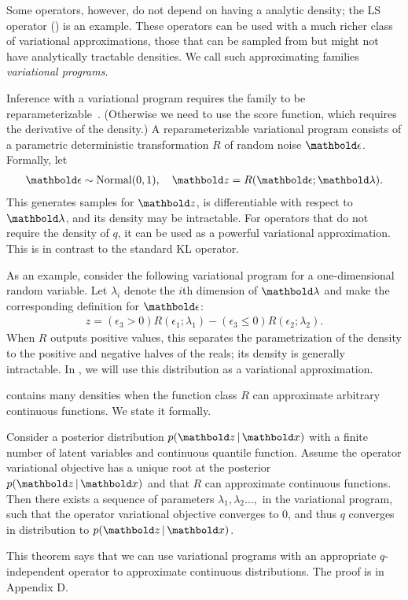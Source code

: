 Some
operators, however, do not depend on having a analytic density; the
\gls{LS} operator () is an example.  These
operators can be used with a much richer class of variational
approximations, those that can be sampled from but might not have
analytically tractable densities.  We call such approximating families
\emph{variational programs}.


Inference with a variational program requires the family to be
reparameterizable~\citep{Kingma:2014,Rezende:2014}.  (Otherwise we
need to use the score function, which requires the derivative of the
density.) A reparameterizable variational program consists of a
parametric deterministic transformation $R$ of random noise $\mbepsilon$. Formally, let
\begin{align}
\mbepsilon \sim \textrm{Normal}(0, 1), \quad \mbz = R(\mbepsilon; \mblambda).
\label{eq:reparam-var-program}
\end{align}
This generates samples for $\mbz$, is differentiable with respect to
$\mblambda$, and its density may be intractable. For operators that do
not require the density of $q$, it can be used as a powerful variational
approximation. This is in contrast to the standard \gls{KL} operator.

As an example, consider the following variational program
for a one-dimensional random variable. Let $\lambda_i$ denote the $i$th
dimension of $\mblambda$ and make the corresponding definition for $\mbepsilon$:
\begin{align}
z = (\epsilon_3 > 0) R(\epsilon_1; \lambda_1) - (\epsilon_3 \leq 0) R(\epsilon_2; \lambda_2).
\label{eq:toy_var_prog}
\end{align}
When $R$ outputs positive values, this separates the parametrization
of the density to the positive and negative halves of the reals; its
density is generally intractable.  In , we will
use this distribution as a variational approximation.

 contains many densities when the function
class $R$ can approximate arbitrary continuous functions.  We state it
formally.  \vspace{0.05in}
\begin{theorem}
  Consider a posterior distribution $p(\mbz\g\mbx)$ with a finite
  number of latent variables and continuous quantile function.  Assume
  the operator variational objective has a unique root at the
  posterior $p(\mbz\g\mbx)$ and that $R$ can approximate continuous
  functions.  Then there exists a sequence of parameters
  $\lambda_1,\lambda_2\ldots,$ in the variational program, such that
  the operator variational objective converges to $0$, and thus $q$
  converges in distribution to $p(\mbz\g\mbx)$.
\end{theorem}
This theorem says that we can use variational programs with an
appropriate $q$-independent operator to approximate continuous
distributions.  The proof is in Appendix D.
